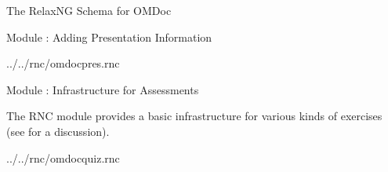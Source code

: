 \begin{tchapter}[id=rnc]{The RelaxNG Schema for OMDoc}
\begin{tsection}[id=rnc:pres]{Module {}: Adding Presentation Information}

{../../rnc/omdocpres.rnc}
\end{tsection}

\begin{tsection}[id=rnc:quiz]{Module {}: Infrastructure for Assessments}

  The RNC module {} provides a basic infrastructure for various
  kinds of exercises (see {} for a discussion).

  
  {../../rnc/omdocquiz.rnc}
\end{tsection}
\end{tchapter}



